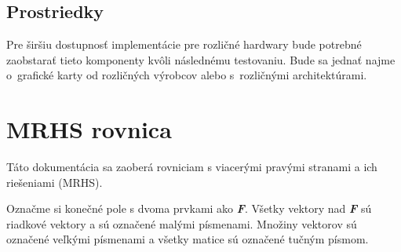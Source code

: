 \subsection{Prostriedky}
Pre širšiu dostupnosť implementácie pre rozličné hardwary bude potrebné zaobstarať tieto komponenty kvôli následnému testovaniu. Bude sa jednať najme o grafické karty od rozličných výrobcov alebo s rozličnými architektúrami.
\section{MRHS rovnica}
Táto dokumentácia sa zaoberá rovniciam s viacerými pravými stranami a ich riešeniami (MRHS).

Označme si konečné pole s dvoma prvkami ako \textit{\textbf{F}}. Všetky vektory nad \textit{\textbf{F}} sú riadkové vektory a sú označené malými písmenami. Množiny vektorov sú označené veľkými písmenami a všetky matice sú označené tučným písmom.

